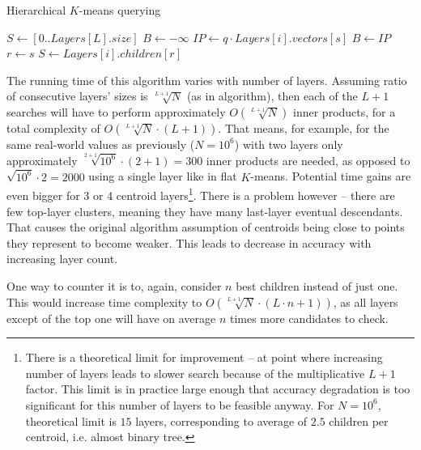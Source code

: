 \begin{algorithm}[H]
	\caption{Hierarchical $K$-means querying}
	\begin{algorithmic}
		\State $ S \gets [0..Layers[L].size] $
			\State $ B \gets -\infty $
				\State $ IP \gets q \cdot Layers[i].vectors[s] $
					\State $ B \gets IP $
					\State $ r \gets s $
				\EndIf
			\EndFor
			\If{$ i = 0 $}
				\State \Return {$ r $}
			\EndIf
			\State $ S \gets Layers[i].children[r] $
		\EndFor
	\end{algorithmic}
\end{algorithm}

The running time of this algorithm varies with number of layers. Assuming 
ratio of consecutive layers' sizes is $ \sqrt[L+1]{N} $ (as in algorithm),
then each of the $ L + 1 $ searches will have to perform approximately
$ O(\sqrt[L+1]{N}) $ inner products, for a total complexity of
$ O(\sqrt[L+1]{N} \cdot (L + 1)) $. That means, for example, for the same real-world
values as previously ($ N=10^6 $) with two layers only approximately
$ \sqrt[2+1]{10^6} \cdot (2 + 1) = 300 $ inner products are needed, as opposed
to $ \sqrt{10^6} \cdot 2 = 2000 $ using a single layer like in flat $K$-means.
Potential time gains are even bigger for 3 or 4 centroid layers\footnote{
There is a theoretical limit for improvement -- at point where increasing
number of layers leads to slower search because of the multiplicative $L+1$ factor.
This limit is in practice large enough that accuracy degradation is too 
significant for this number of layers to be feasible anyway. 
For $N=10^6$, theoretical limit is $15$ layers, corresponding to average 
of $2.5$ children per centroid, i.e. almost binary tree.
}. There is a problem however -- there are few top-layer clusters, 
meaning they have many last-layer eventual descendants. That causes the
original algorithm assumption of centroids being close to points they represent
to become weaker. This leads to decrease in accuracy with increasing layer
count.

One way to counter it is to, again, consider $n$ best children instead of
just one. This would increase time complexity to 
$ O(\sqrt[L+1]{N} \cdot (L \cdot n + 1)) $, as all layers except of the top one
will have on average $n$ times more candidates to check.

